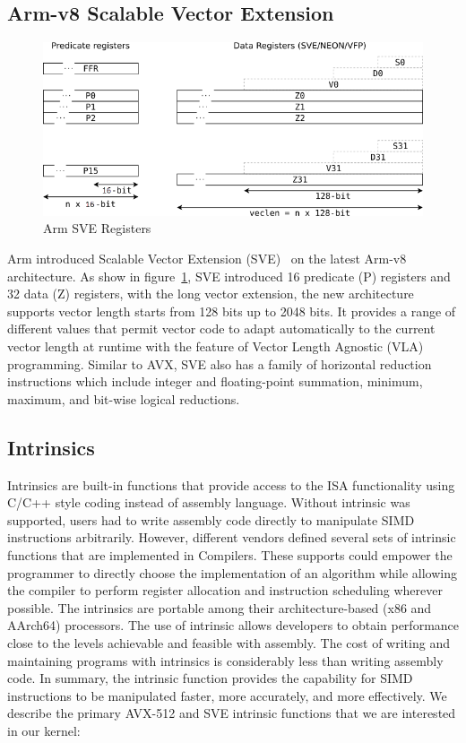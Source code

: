 \documentclass[5p,times,twocolumn]{elsarticle}
\begin{document}
\subsection{Arm-v8 Scalable Vector Extension}
\begin{figure}[h]
    \centering
    \includegraphics[width=\linewidth]{armsvereg.png}
    \caption{Arm SVE Registers}
    \label{fig:armsvereg}
\end{figure}
Arm introduced Scalable Vector Extension (SVE)~\cite{armSVE2} on the latest Arm-v8 architecture.
As show in figure~\ref{fig:armsvereg}, SVE introduced 16 predicate (P) registers and 32 data (Z) registers,
with the long vector extension, the new architecture
supports vector length starts
from 128 bits up to 2048 bits. It provides a range of different
values that permit vector code to adapt automatically to the
current vector length at runtime with the feature of Vector
Length Agnostic (VLA) programming. Similar to AVX, SVE also has a family of
horizontal reduction instructions which include integer and floating-point summation, minimum, maximum,
and bit-wise logical reductions.

\subsection{Intrinsics}
Intrinsics are built-in functions that provide access to the ISA functionality
using C/C++ style coding instead of assembly language. Without intrinsic was
supported, users had to write assembly code directly to manipulate SIMD
instructions arbitrarily.
However, different vendors defined several sets of intrinsic functions that are implemented
in Compilers. These supports could empower the programmer to directly choose the implementation
of an algorithm while allowing the compiler to perform register allocation
and instruction scheduling wherever possible. The intrinsics are portable among their
architecture-based (x86 and AArch64) processors. The use of intrinsic
allows developers to obtain performance close to the levels achievable and feasible with assembly.
The cost of writing and maintaining programs with intrinsics is considerably less than writing assembly code.
In summary, the intrinsic function provides the capability for SIMD instructions to be manipulated faster, more
accurately, and more effectively.
We describe the primary AVX-512 and SVE intrinsic functions that we are interested in our kernel:
\end{document}

